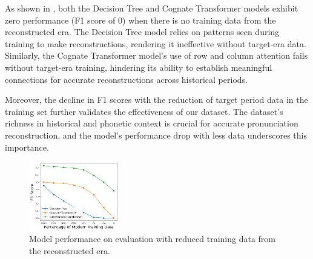 As shown in , both the Decision Tree and Cognate Transformer models exhibit zero performance (F1 score of 0) when there is no training data from the reconstructed era. The Decision Tree model relies on patterns seen during training to make reconstructions, rendering it ineffective without target-era data. Similarly, the Cognate Transformer model's use of row and column attention fails without target-era training, hindering its ability to establish meaningful connections for accurate reconstructions across historical periods.

Moreover, the decline in F1 scores with the reduction of target period data in the training set further validates the effectiveness of our dataset. The dataset's richness in historical and phonetic context is crucial for accurate pronunciation reconstruction, and the model's performance drop with less data underscores this importance.

\begin{figure}[ht]
    \centering
    \includegraphics[width=0.35\textwidth]{images/target_reduced.png}
    \caption{Model performance on evaluation with reduced training data from the reconstructed era.}
    \label{fig:reduce input data}
\end{figure}


